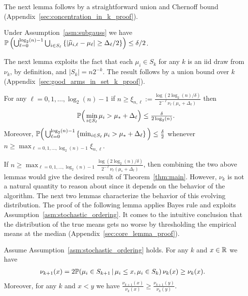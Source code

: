 The next lemma follows by a straightforward union and Chernoff bound (Appendix~\ref{sec:concentration_in_k_proof}).
\begin{lemma}\label{lem:concentration_in_k}
Under Assumption~\ref{asm:subgauss} we have
$\P\left( \bigcup_{\ell=0}^{\log_2(n)-1} \bigcup_{i \in S_{\ell}} \left\{ |\widehat{\mu}_{i,\ell} - \mu_\ell| \geq \Delta_\ell/2 \right\} \right) \leq \delta/2$.
\end{lemma}

The next lemma exploits the fact that each $\mu_i \in S_k$ for any $k$ is an iid draw from $\nu_k$, by definition, and $|S_k| = n 2^{-k}$.
The result follows by a union bound over $k$ (Appendix~\ref{sec:good_arms_in_set_k_proof}).
\begin{lemma}\label{lem:good_arms_in_set_k}
For any $\ell=0,1,\dots,\log_2(n)-1$ if  $n \geq \xi_{n,\ell} := \frac{\log(2 \log_2(n)/\delta)}{2^{-\ell} \nu_\ell(\mu_* + \Delta_\ell)}$ then 
\begin{align*}
\P\Big(\min_{i \in S_\ell} \mu_i > \mu_* + \Delta_\ell \Big) \leq \tfrac{\delta}{2 \log_2(n)}.
\end{align*}
Moreover, $\P\Big( \bigcup_{\ell=0}^{\log_2(n)-1} \left\{ \min_{i \in S_\ell} \mu_i > \mu_* + \Delta_\ell \right\} \Big)\leq \frac{\delta}{2}$
whenever $n \geq \max_{\ell=0,1,\dots,\log_2(n)-1} \xi_{n,\ell}$.
\end{lemma}


If $n \geq  \max_{\ell=0,1,\dots,\log_2(n)-1} \frac{\log(2 \log_2(n)/\delta)}{2^{-\ell} \nu_\ell(\mu_* + \Delta_\ell)}$, then combining the two above lemmas would give the desired result of Theorem~\ref{thm:main}.
However, $\nu_k$ is not a natural quantity to reason about since it depends on the behavior of the algorithm.
The next two lemmas characterize the behavior of this evolving distribution.
The proof of the following lemma applies Bayes rule and exploits Assumption~\ref{asm:stochastic_ordering}. 
It comes to the intuitive conclusion that the distribution of the true means gets no worse by thresholding the empirical means at the median (Appendix~\ref{sec:core_lemma_proof}).
\begin{lemma}\label{lem:core_lemma}
Assume Assumption~\ref{asm:stochastic_ordering} holds.
For any $k$ and $x\in \R$ we have
\begin{align*}
\nu_{k+1}(x) &= 2 \P( \mu_i \in S_{k+1} \, | \, \mu_i \leq x, \mu_i \in S_{k} ) \, \nu_k(x)
\geq \nu_k(x).
\end{align*}
Moreover, for any $k$ and $x < y$ we have $\frac{\nu_{k+1}(x)}{\nu_k(x)} \geq \frac{\nu_{k+1}(y)}{\nu_k(y)}$.
\end{lemma} 

